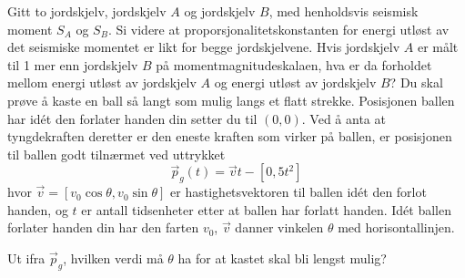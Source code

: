 Gitt to jordskjelv, jordskjelv $ A $ og jordskjelv $ B $, med henholdsvis seismisk moment $ S_A $ og $ S_B $. Si videre at proporsjonalitetskonstanten for energi utløst av det seismiske momentet er likt for begge jordskjelvene. Hvis jordskjelv $ A $ er målt til 1 mer enn jordskjelv $ B $ på momentmagnitudeskalaen, hva er da forholdet mellom energi utløst av jordskjelv $ A $ og energi utløst av jordskjelv $ B $? 
\newpage
{}
Du skal prøve å kaste en ball så langt som mulig langs et flatt strekke. Posisjonen ballen har idét den forlater handen din setter du til $ (0, 0) $. Ved å anta at tyngdekraften deretter er den eneste kraften som virker på ballen, er posisjonen til ballen godt tilnærmet ved uttrykket
\[ \vec{p}_g(t)=\vec{v}t-[0, 5t^2] \]
hvor $ \vec{v}=[v_0 \cos \theta, v_0 \sin \theta] $ er hastighetsvektoren til ballen idét den forlot handen, og $ t $ er antall tidsenheter etter at ballen har forlatt handen. Idét ballen forlater handen din har den farten $ v_0 $, $ \vec{v} $ danner vinkelen $ \theta $ med horisontallinjen.\vsk 

Ut ifra $ \vec{p}_g $, hvilken verdi må $ \theta $ ha for at kastet skal bli lengst mulig?



